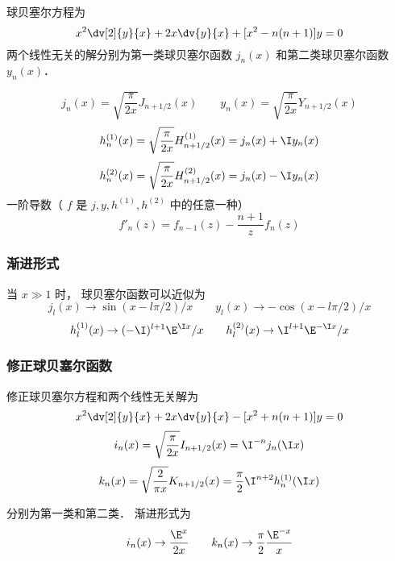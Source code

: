 

球贝塞尔方程为
\begin{equation}
x^2 \dv[2]{y}{x} + 2x \dv{y}{x} + [x^2 - n(n + 1)]y = 0
\end{equation}
两个线性无关的解分别为第一类球贝塞尔函数 $j_n(x)$ 和第二类球贝塞尔函数 $y_n(x)$．

\begin{equation}
j_n(x) = \sqrt{\frac{\pi}{2x}} J_{n+1/2}(x)
\qquad
y_n(x) = \sqrt{\frac{\pi}{2x}} Y_{n+1/2}(x)
\end{equation}
\begin{equation}
h_n^{(1)}(x) = \sqrt {\frac{\pi }{2x}} H_{n+1/2}^{(1)}(x) = j_n(x) + \I y_n(x)
\end{equation}
\begin{equation}
h_n^{(2)}(x) = \sqrt{\frac{\pi }{2x}} H_{n+1/2}^{(2)}(x) = j_n(x) - \I y_n(x)
\end{equation}
一阶导数（ $f$ 是 $j, y, h^{(1)}, h^{(2)}$ 中的任意一种）
\begin{equation}
f'_n(z) = f_{n-1}(z) - \frac{n+1}{z} f_n(z)
\end{equation}

\subsubsection{渐进形式}
当 $x \gg 1$ 时， 球贝塞尔函数可以近似为
\begin{equation}
j_l(x) \to \sin(x - l\pi /2)/x
\qquad
y_l(x) \to  - \cos(x - l\pi /2)/x
\end{equation}
\begin{equation}
h_l^{(1)}(x) \to ( -\I)^{l+1} \E^{\I x}/x
\qquad
h_l^{(2)}(x) \to \I^{l + 1} \E^{-\I x}/x
\end{equation}
    

\subsubsection{修正球贝塞尔函数}

修正球贝塞尔方程和两个线性无关解为
\begin{equation}
x^2 \dv[2]{y}{x} + 2x\dv{y}{x} - [x^2 + n(n + 1)]y = 0
\end{equation}
\begin{equation}
i_n(x) = \sqrt{\frac{\pi }{2x}} I_{n+1/2}(x) = \I^{-n} j_n(\I x)
\end{equation}
\begin{equation}
k_n(x) = \sqrt{\frac{2}{\pi x}} K_{n+1/2}(x) = \frac{\pi }{2} \I^{n + 2} h_n^{(1)}(\I x)
\end{equation}

分别为第一类和第二类． 渐进形式为
\begin{equation}
i_n(x) \to \frac{\E^x}{2x}
\qquad
k_n(x) \to \frac{\pi}{2} \frac{\E^{-x}}{x}
\end{equation}
